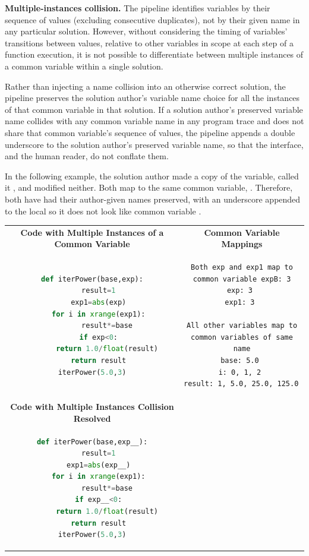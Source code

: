 {\bf Multiple-instances collision.} The pipeline identifies variables by their sequence of values (excluding consecutive duplicates), not by their given name in any particular solution. However, without considering the timing of variables' transitions between values, relative to other variables in scope at each step of a function execution, it is not possible to differentiate between multiple instances of a common variable within a single solution. 

Rather than injecting a name collision into an otherwise correct solution, the pipeline preserves the solution author's variable name choice for all the instances of that common variable in that solution. If a solution author's preserved variable name collides with any common variable name in any program trace and does not share that common variable's sequence of values, the pipeline appends a double underscore to the solution author's preserved variable name, so that the interface, and the human reader, do not conflate them.

In the following example, the solution author made a copy of the  variable, called it , and modified neither. Both map to the same common variable, . Therefore, both have had their author-given names preserved, with an underscore appended to the local  so it does not look like common variable . 

\begin{tabular}{cc}
{\bf Code with Multiple Instances of a Common Variable} & {\bf Common Variable Mappings} \\
\begin{minipage}{0.5\linewidth}
\begin{lstlisting}[language=python]
def iterPower(base,exp):
   result=1
   exp1=abs(exp)
   for i in xrange(exp1):
       result*=base
   if exp<0:
       return 1.0/float(result)
   return result
iterPower(5.0,3)
\end{lstlisting}
\end{minipage}
&
\begin{minipage}{0.5\linewidth}
\begin{lstlisting}[]
Both exp and exp1 map to common variable expB: 3
exp: 3 
exp1: 3 

All other variables map to common variables of same name
base: 5.0 
i: 0, 1, 2 
result: 1, 5.0, 25.0, 125.0 
\end{lstlisting}
\end{minipage} \\
{\bf Code with Multiple Instances Collision Resolved} & \\
\begin{minipage}{0.5\linewidth}
\begin{lstlisting}[language=python,linebackgroundcolor={\lstcolorlines[lightyellow]{1,3,6}}]
def iterPower(base,exp__):
   result=1
   exp1=abs(exp__)
   for i in xrange(exp1):
       result*=base
   if exp__<0:
       return 1.0/float(result)
   return result
iterPower(5.0,3)
\end{lstlisting}
\end{minipage}
& \\
\end{tabular}

